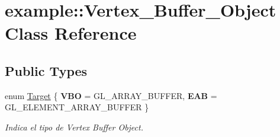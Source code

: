 \hypertarget{classexample_1_1_vertex___buffer___object}{}\section{example\+::Vertex\+\_\+\+Buffer\+\_\+\+Object Class Reference}
\label{classexample_1_1_vertex___buffer___object}
\subsection*{Public Types}
\begin{DoxyCompactItemize}
\item 
enum \mbox{\hyperlink{classexample_1_1_vertex___buffer___object_a376260819cb29bd5300ce2b9885dedb7}{Target}} \{ {\bfseries V\+BO} = G\+L\+\_\+\+A\+R\+R\+A\+Y\+\_\+\+B\+U\+F\+F\+ER, 
{\bfseries E\+AB} = G\+L\+\_\+\+E\+L\+E\+M\+E\+N\+T\+\_\+\+A\+R\+R\+A\+Y\+\_\+\+B\+U\+F\+F\+ER
 \}
\begin{DoxyCompactList}\small\item\em Indica el tipo de Vertex Buffer Object. \end{DoxyCompactList}\end{DoxyCompactItemize}
